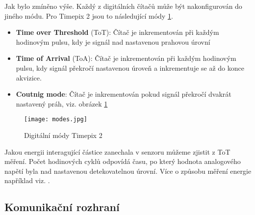 Jak bylo zmíněno výše. Každý z digitálních čítačů může být nakonfigurován do jiného módu. Pro Timepix 2 jsou to následující módy \ref{fig:modes}. 
\begin{itemize}
	\item \textbf{Time over Threshold} (ToT): Čítač je inkrementován při každým hodinovým pulsu, kdy je signál nad nastavenou prahovou úrovní
	\item \textbf{Time of Arrival} (ToA): Čítač je inkrementován při každým hodinovým pulsu, kdy signál překročí nastavenou úroveň a inkrementuje se až do konce akvizice.
	\item \textbf{Coutnig mode}: Čítač je inkrementován pokud signál překročí dvakrát nastavený práh, viz. obrázek \ref{fig:modes} 
\end{itemize}
\begin{figure}[h!]
	\centering
	\captionsetup{justification=centering}
	\texttt{[image: modes.jpg]}
	\caption{Digitální módy Timepix 2 \cite{Manek}} 
	\label{fig:modes}
\end{figure}	

Jakou energii interagující částice zanechala v senzoru můžeme zjistit z ToT měření. Počet hodinových cyklů odpovídá času, po který hodnota analogového napětí byla nad nastavenou detekovatelnou úrovní. Více o způsobu měření energie například viz. \cite{JAKUBEK2011S262}.


\subsection{Komunikační rozhraní}
\label{Komunikacni rozhrani}
